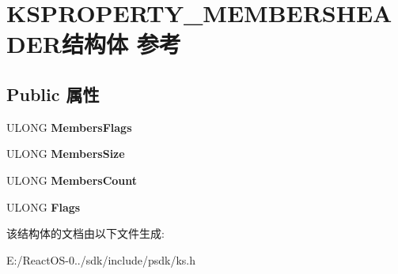 \hypertarget{struct_k_s_p_r_o_p_e_r_t_y___m_e_m_b_e_r_s_h_e_a_d_e_r}{}\section{K\+S\+P\+R\+O\+P\+E\+R\+T\+Y\+\_\+\+M\+E\+M\+B\+E\+R\+S\+H\+E\+A\+D\+E\+R结构体 参考}
\label{struct_k_s_p_r_o_p_e_r_t_y___m_e_m_b_e_r_s_h_e_a_d_e_r}
\subsection*{Public 属性}
\begin{DoxyCompactItemize}
\item 
\mbox{\label{struct_k_s_p_r_o_p_e_r_t_y___m_e_m_b_e_r_s_h_e_a_d_e_r_a7ce4c541d1e347aad8c19d241f1ef890}} 
U\+L\+O\+NG {\bfseries Members\+Flags}
\item 
\mbox{\label{struct_k_s_p_r_o_p_e_r_t_y___m_e_m_b_e_r_s_h_e_a_d_e_r_ab3b54cd17776211c90863bdad4485513}} 
U\+L\+O\+NG {\bfseries Members\+Size}
\item 
\mbox{\label{struct_k_s_p_r_o_p_e_r_t_y___m_e_m_b_e_r_s_h_e_a_d_e_r_a9d28d105427e281243c4819a94f8a450}} 
U\+L\+O\+NG {\bfseries Members\+Count}
\item 
\mbox{\label{struct_k_s_p_r_o_p_e_r_t_y___m_e_m_b_e_r_s_h_e_a_d_e_r_a9e37e2476cef657b377d427668ebe30f}} 
U\+L\+O\+NG {\bfseries Flags}
\end{DoxyCompactItemize}


该结构体的文档由以下文件生成\+:\begin{DoxyCompactItemize}
\item 
E\+:/\+React\+O\+S-\/0../sdk/include/psdk/ks.\+h\end{DoxyCompactItemize}
